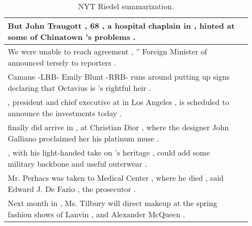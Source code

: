 \begin{table}



\caption{NYT Riedel summarization.}

\label{table03:nyt}

\begin{tabular}{p{} P{1,3cm} }
\hline
\hline
{} {But John Traugott , 68 , a hospital chaplain in \underline{} , \underline{} hinted at some of Chinatown 's problems .} &    \\ 
\hline
{} {We were unable to reach agreement , '' Foreign Minister \underline{} of \underline{} announced tersely to reporters .} &    \\ 
\hline
{} {Camane -LRB- Emily Blunt -RRB- runs around \underline{} putting up signs declaring that Octavius is \underline{} 's rightful heir .} &    \\ 
\hline
{} {\underline{} , president and chief executive at \underline{} in Los Angeles , is scheduled to announce the investments today .} &    \\ 
\hline
{} {\underline{} finally did arrive in \underline{} , at Christian Dior , where the designer John Galliano proclaimed her his platinum muse .} &    \\ 
\hline
{} {\underline{} , with his light-handed take on \underline{} 's heritage , could add some military backbone and useful outerwear .} &    \\ 
\hline
{} {Mr. Perhacs was taken to \underline{} Medical Center , where he died , said Edward J. De Fazio , the \underline{} prosecutor .} &    \\ 
\hline
{} {Next month in \underline{} , Ms. Tilbury will direct makeup at the spring fashion shows of Lanvin , \underline{} and Alexander McQueen .} &    \\ 

\end{tabular}
\end{table}
